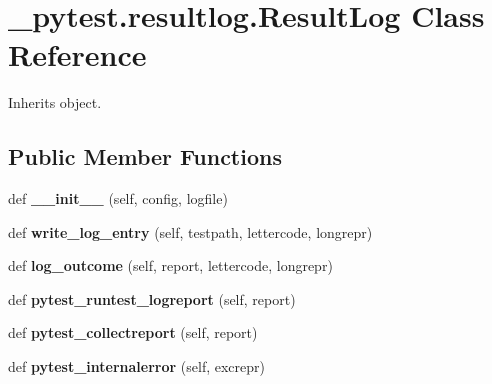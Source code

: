 \hypertarget{class__pytest_1_1resultlog_1_1_result_log}{}\section{\+\_\+pytest.\+resultlog.\+Result\+Log Class Reference}
\label{class__pytest_1_1resultlog_1_1_result_log}


Inherits object.

\subsection*{Public Member Functions}
\begin{DoxyCompactItemize}
\item 
\mbox{\label{class__pytest_1_1resultlog_1_1_result_log_a11763fd3cb38ab23cb499ed55d91b73b}} 
def {\bfseries \+\_\+\+\_\+init\+\_\+\+\_\+} (self, config, logfile)
\item 
\mbox{\label{class__pytest_1_1resultlog_1_1_result_log_a184df5c071e4b3f5e42ccbed0fc2911d}} 
def {\bfseries write\+\_\+log\+\_\+entry} (self, testpath, lettercode, longrepr)
\item 
\mbox{\label{class__pytest_1_1resultlog_1_1_result_log_a8469eec70247f217776d868a9dd5cfae}} 
def {\bfseries log\+\_\+outcome} (self, report, lettercode, longrepr)
\item 
\mbox{\label{class__pytest_1_1resultlog_1_1_result_log_ae556134f8b4c1a4f4ff66e6faa4b7a8d}} 
def {\bfseries pytest\+\_\+runtest\+\_\+logreport} (self, report)
\item 
\mbox{\label{class__pytest_1_1resultlog_1_1_result_log_a54902ccd0f28a7e10056e18216aadc0f}} 
def {\bfseries pytest\+\_\+collectreport} (self, report)
\item 
\mbox{\label{class__pytest_1_1resultlog_1_1_result_log_a951949bfd4f874039c4891c7866cd033}} 
def {\bfseries pytest\+\_\+internalerror} (self, excrepr)
\end{DoxyCompactItemize}
